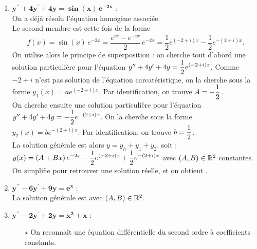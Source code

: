 \documentclass[a4paper, 11pt,reqno]{article}
\begin{document}
\begin{correction}
\begin{enumerate}
          On a d\'ej\`a r\'esolu l'\'equation homog\`ene associ\'ee.\\
          Le second membre est cette fois de la forme $P(x) e^{mx}$ avec $m=-2$ racine double de l'\'equation caract\'eristique. On cherche donc une solution particuli\`ere sous  la forme $y_p(x)=x^2(ax^2+bx+c)e^{-2x}$ avec $(a,b,c)\in\R^3$. On obtient par identification : $a=\ddp \frac{1}{12}$, $b=0$ et $c=0$.\\
          La solution g\'en\'erale est alors:  avec $(A,B)\in\R^2$ constantes.
    \item $\mathbf{y^{\prime\prime}+4y^{\prime}+4y=\sin(x) \, e^{-2x}}$ :\\
          On a d\'ej\`a r\'esolu l'\'equation homog\`ene associ\'ee.\\
          Le second membre est cette fois de la forme
          $$f(x)=\sin (x) \, e^{-2x} = \frac{e^{ix}-e^{-ix}}{2} \, e^{-2x} = \frac{1}{2} e^{(-2+i)x} - \frac{1}{2} e^{-(2+i)x}.$$
          On utilise alors le principe de superposition : on cherche tout d'abord une solution particuli\`ere pour l'\'equation $y^{\prime\prime}+4y^{\prime}+4y=\displaystyle \frac{1}{2} e^{(-2+i)x}$. Comme $-2+i$ n'est pas solution de l'\'equation carcat\'eristique, on la cherche sous la forme $y_1(x) = a e^{(-2+i)x}$. Par identification, on trouve $A = -\displaystyle \frac{1}{2}$.\\
          On cherche ensuite une solution particuli\`ere pour l'\'equation $y^{\prime\prime}+4y^{\prime}+4y=\displaystyle -\frac{1}{2} e^{-(2+i)x}$. On la cherche sous la forme $y_2(x) = b e^{-(2+i)x}$. Par identification, on trouve $b = \displaystyle \displaystyle \frac{1}{2}$.\\
          La solution g\'en\'erale est alors $y=y_h+y_1+y_2$, soit : $y(x) = \displaystyle  \left(A +B x \right)e^{-2x} - \frac{1}{2} e^{(-2+i)x} + \displaystyle \frac{1}{2} e^{-(2+i)x}$ avec $(A,B)\in\R^2$ constantes. On simplifie pour retrouver une solution r\'eelle, et on obtient .
    \item $\mathbf{y^{\prime\prime}-6y^{\prime}+9y=e^x}$ :\\
          La solution g\'en\'erale  est  avec $(A,B)\in\R^2$.
    \item $\mathbf{y^{\prime\prime}-2y^{\prime}+2y=x^2+x}$ :\\
          \begin{itemize}
            \item[$\star$] On reconna\^{i}t une \'equation diff\'erentielle du second ordre \`{a} coefficients constants.

\end{itemize}
\end{enumerate}
\end{correction}
\end{document}
